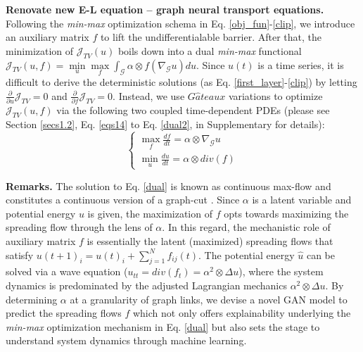 \documentclass{article}
\begin{document}
\textbf{Renovate new E-L equation -- graph neural transport equations.} Following the \textit{min-max} optimization schema in Eq. \ref{obj_fun}-\ref{clip}, we introduce an auxiliary matrix $f$ to lift the undifferentialable barrier. After that, the minimization of $\mathcal{J}_{TV} (u)$ boils down into a dual \textit{min-max} functional $\mathcal{J}_{TV}(u,f)=\mathop {\min }\limits_{u} \mathop {\max}\limits_{f} \int_\mathcal{G} \alpha \otimes f (\nabla_{\mathcal{G}} u) du$. Since $u(t)$ is a time series, it is difficult to derive the deterministic solutions (as Eq. \ref{first_layer}-\ref{clip}) by letting $\frac{\partial} {{\partial u}}\mathcal{J}_{TV}=0$ and $\frac{\partial} {{\partial f}}\mathcal{J}_{TV}=0$. Instead, we use $G\hat a teaux$ variations to optimize $\mathcal{J}_{TV}(u,f)$ via the following two coupled time-dependent PDEs (please see Section \ref{secs1.2}, Eq. \ref{eqs14} to Eq. \ref{dual2}, in Supplementary for details):
\begin{equation}
\label{dual}
\left\{ {\begin{array}{*{20}{c}}
{\mathop {\max }\limits_f \frac{{df}}{{dt}} = {\alpha \otimes \nabla _\mathcal{G}}u}\\
{\mathop {\min }\limits_u \frac{{du}}{{dt}} = \alpha \otimes div(f)}
\end{array}} \right.
\end{equation}

\textbf{Remarks.} The solution to Eq. \ref{dual} is known as continuous max-flow and constitutes a continuous version of a graph-cut \cite{appleton2005globally}. Since $\alpha$ is a latent variable and potential energy $u$ is given, the maximization of $f$ opts towards maximizing the spreading flow through the lens of $\alpha$. In this regard, the mechanistic role of auxiliary matrix $f$ is essentially the latent (maximized) spreading flows that satisfy $u(t + 1)_i = u(t)_i + \sum\nolimits_{j = 1}^N {{f_{ij}}(t)}$. The potential energy $\hat{u}$ can be solved via a wave equation ($u_{tt}=div(f_t)=\alpha^2 \otimes \Delta u$), where the system dynamics is predominated by the adjusted Lagrangian mechanics $\alpha^2 \otimes \Delta u$. By determining $\alpha$ at a granularity of graph links, we devise a novel GAN model to predict the spreading flows $f$ which not only offers explainability underlying the \textit{min-max} optimization mechanism in Eq. \ref{dual} but also sets the stage to understand system dynamics through machine learning.

\end{document}
